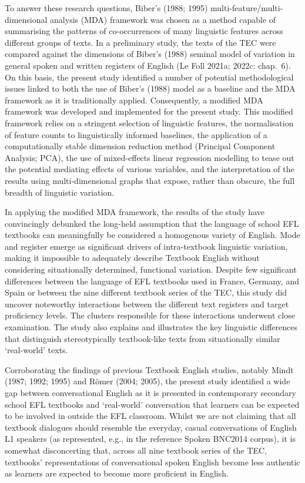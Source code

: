 \documentclass[
  letterpaper,
  DIV=11,
  numbers=noendperiod]{scrreprt}
\begin{document}
To answer these research questions, Biber's (1988; 1995)
multi-feature/multi-dimensional analysis (MDA) framework was chosen as a
method capable of summarising the patterns of co-occurrences of many
linguistic features across different groups of texts. In a preliminary
study, the texts of the TEC were compared against the dimensions of
Biber's (1988) seminal model of variation in general spoken and written
registers of English (Le Foll 2021a; 2022c: chap.~6). On this basis, the
present study identified a number of potential methodological issues
linked to both the use of Biber's (1988) model as a baseline and the MDA
framework as it is traditionally applied. Consequently, a modified MDA
framework was developed and implemented for the present study. This
modified framework relies on a stringent selection of linguistic
features, the normalisation of feature counts to linguistically informed
baselines, the application of a computationally stable dimension
reduction method (Principal Component Analysis; PCA), the use of
mixed-effects linear regression modelling to tease out the potential
mediating effects of various variables, and the interpretation of the
results using multi-dimensional graphs that expose, rather than obscure,
the full breadth of linguistic variation.

In applying the modified MDA framework, the results of the study have
convincingly debunked the long-held assumption that the language of
school EFL textbooks can meaningfully be considered a homogenous variety
of English. Mode and register emerge as significant drivers of
intra-textbook linguistic variation, making it impossible to adequately
describe Textbook English without considering situationally determined,
functional variation. Despite few significant differences between the
language of EFL textbooks used in France, Germany, and Spain or between
the nine different textbook series of the TEC, this study did uncover
noteworthy interactions between the different text registers and target
proficiency levels. The clusters responsible for these interactions
underwent close examination. The study also explains and illustrates the
key linguistic differences that distinguish stereotypically
textbook-like texts from situationally similar `real-world' texts.

Corroborating the findings of previous Textbook English studies, notably
Mindt (1987; 1992; 1995) and Römer (2004; 2005), the present study
identified a wide gap between conversational English as it is presented
in contemporary secondary school EFL textbooks and `real-world'
conversation that learners can be expected to be involved in outside the
EFL classroom. Whilst we are not claiming that all textbook dialogues
should resemble the everyday, casual conversations of English L1
speakers (as represented, e.g., in the reference Spoken BNC2014 corpus),
it is somewhat disconcerting that, across all nine textbook series of
the TEC, textbooks' representations of conversational spoken English
become less authentic as learners are expected to become more proficient
in English.
\end{document}
